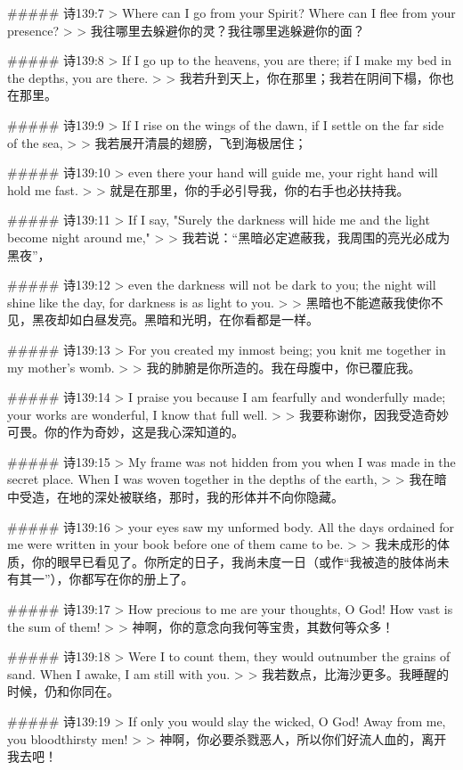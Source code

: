 ##### 诗139:7
> Where can I go from your Spirit? Where can I flee from your presence?
>
> 我往哪里去躲避你的灵？我往哪里逃躲避你的面？


##### 诗139:8
> If I go up to the heavens, you are there; if I make my bed in the depths, you are there.
>
> 我若升到天上，你在那里；我若在阴间下榻，你也在那里。


##### 诗139:9
> If I rise on the wings of the dawn, if I settle on the far side of the sea,
>
> 我若展开清晨的翅膀，飞到海极居住；


##### 诗139:10
> even there your hand will guide me, your right hand will hold me fast.
>
> 就是在那里，你的手必引导我，你的右手也必扶持我。


##### 诗139:11
> If I say, "Surely the darkness will hide me and the light become night around me,"
>
> 我若说：“黑暗必定遮蔽我，我周围的亮光必成为黑夜”，


##### 诗139:12
> even the darkness will not be dark to you; the night will shine like the day, for darkness is as light to you.
>
> 黑暗也不能遮蔽我使你不见，黑夜却如白昼发亮。黑暗和光明，在你看都是一样。


##### 诗139:13
> For you created my inmost being; you knit me together in my mother's womb.
>
> 我的肺腑是你所造的。我在母腹中，你已覆庇我。


##### 诗139:14
> I praise you because I am fearfully and wonderfully made; your works are wonderful, I know that full well.
>
> 我要称谢你，因我受造奇妙可畏。你的作为奇妙，这是我心深知道的。


##### 诗139:15
> My frame was not hidden from you when I was made in the secret place. When I was woven together in the depths of the earth,
>
> 我在暗中受造，在地的深处被联络，那时，我的形体并不向你隐藏。


##### 诗139:16
> your eyes saw my unformed body. All the days ordained for me were written in your book before one of them came to be.
>
> 我未成形的体质，你的眼早已看见了。你所定的日子，我尚未度一日（或作“我被造的肢体尚未有其一”），你都写在你的册上了。


##### 诗139:17
> How precious to me are your thoughts, O God! How vast is the sum of them!
>
> 神啊，你的意念向我何等宝贵，其数何等众多！


##### 诗139:18
> Were I to count them, they would outnumber the grains of sand. When I awake, I am still with you.
>
> 我若数点，比海沙更多。我睡醒的时候，仍和你同在。


##### 诗139:19
> If only you would slay the wicked, O God! Away from me, you bloodthirsty men!
>
> 神啊，你必要杀戮恶人，所以你们好流人血的，离开我去吧！


